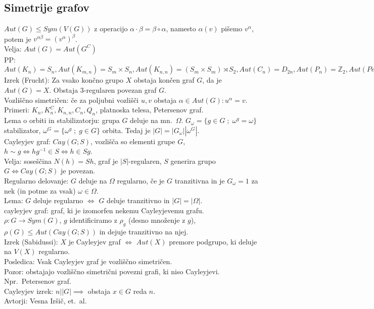 \documentclass{article}
\theoremstyle{definition}
\def\Z{\mathbb{Z}}
\begin{document}
\subsection*{Simetrije grafov}
$Aut(G) \leq Sym(V(G))$ z operacijo $\alpha \cdot \beta = \beta \circ \alpha$, namesto $\alpha(v)$ pišemo $v^{\alpha}$, potem je $v^{\alpha \beta} = (v^{\alpha})^{\beta}$.\\
Velja: $Aut(G) = Aut(G^C)$\\
PP: $Aut(K_n) = S_n, Aut(K_{m,n}) = S_m \times S_n, Aut(K_{n,n}) = (S_m \times S_m) \rtimes S_2, Aut(C_n) = D_{2n}, Aut(P_n) = \Z_2, Aut(Petersen) = S_5$\\
Izrek (Frucht): Za vsako končno grupo $X$ obstaja končen graf $G$, da je $Aut(G) = X$. Obstaja 3-regularen povezan graf $G$.\\
Vozliščno simetričen: če za poljubni vozlišči $u, v$ obstaja $\alpha \in Aut(G): u^{\alpha} = v$. \\
Primeri: $K_n, K_n^C, K_{n,n}, C_n, Q_n$, platnoska telesa, Petersenov graf.\\
Lema o orbiti in stabilizatorju: grupa $G$ deluje na mn.\ $\Omega$. $G_{\omega} = \{g \in G \; ; \; \omega^g = \omega\}$ stabilizator, $\omega^G = \{\omega^g \; ; \; g \in G\}$ orbita. Tedaj je $|G| = |G_{\omega}| |\omega^G|$.\\
Cayleyjev graf: $Cay(G; S)$, vozlišča so elementi grupe $G$, $h \sim g \iff h g^{-1} \in S \iff h \in Sg$.\\
Velja: soseščina $N(h) = S h$, graf je $|S|$-regularen, $S$ generira grupo $G \iff Cay(G; S)$ je povezan.\\
Regularno delovanje: $G$ deluje na $\Omega$ regularno, če je $G$ tranzitivna in je $G_{\omega} = 1$ za nek (in potme za vsak) $\omega \in \Omega$.\\
Lema: $G$ deluje regularno $\iff$ $G$ deluje tranzitivno in $|G| = |\Omega|$.\\
cayleyjev graf: graf, ki je izomorfen nekemu Cayleyjevemu grafu.\\
$\rho \colon G \to Sym(G)$, $g$ identificiramo z $\rho_g$ (desno množenje z $g$), $\rho(G) \leq Aut(Cay(G; S))$ in dejuje tranzitivno na njej.\\
Izrek (Sabidussi): $X$ je Cayleyjev graf $\iff$ $Aut(X)$ premore podgrupo, ki deluje na $V(X)$ regularno.\\
Posledica: Vsak Cayleyjev graf je vozliščno simetričen.\\
Pozor: obstajajo vozliščno simetrični povezni grafi, ki niso Cayleyjevi. Npr.\ Petersenov graf.\\
Cayleyjev izrek: $n | |G| \implies $ obstaja $x \in G$ reda $n$.\\
\vspace{-1ex}
\hfill Avtorji: Vesna Iršič, et.\ al.
\end{document}
